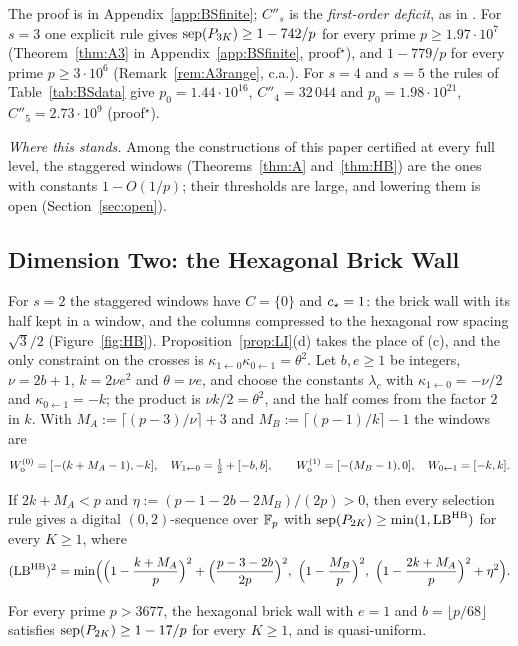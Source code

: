 The proof is in Appendix~\ref{app:BSfinite}; $C''_s$ is the \emph{first-order deficit}, as in \cite{Gru26geo}%
. For $s=3$ one explicit rule gives $\operatorname{sep}(P_{3K})\ge1-742/p$ for every prime $p\ge1.97\cdot10^7$ (Theorem~\ref{thm:A3} in Appendix~\ref{app:BSfinite}, proof${}^\star$), and $1-779/p$ for every prime $p\ge3\cdot10^6$ (Remark~\ref{rem:A3range}, c.a.). For $s=4$ and $s=5$ the rules of Table~\ref{tab:BSdata} give $p_0=1.44\cdot10^{16}$, $C''_4=32\,044$ and $p_0=1.98\cdot10^{21}$, $C''_5=2.73\cdot10^9$ (proof${}^\star$).

\emph{Where this stands.} Among the constructions of this paper certified at every full level, the staggered windows (Theorems~\ref{thm:A} and~\ref{thm:HB}) are the ones with constants $1-O(1/p)$; their thresholds are large, and lowering them is open (Section~\ref{sec:open}).

\subsection{Dimension Two: the Hexagonal Brick Wall}\label{sec:HB}
For $s=2$ the staggered windows have $C=\{0\}$ and $c_{\star}=1$: the brick wall with its half kept in a window, and the columns compressed to the hexagonal row spacing $\sqrt3/2$ (Figure~\ref{fig:HB}). Proposition~\ref{prop:LI}(d) takes the place of (c), and the only constraint on the crosses is $\kappa_{1\leftarrow0}\kappa_{0\leftarrow1}=\theta^2$. Let $b,e\ge1$ be integers, $\nu=2b+1$, $k=2\nu e^2$ and $\theta=\nu e$, and choose the constants $\lambda_c$ with $\kappa_{1\leftarrow0}=-\nu/2$ and $\kappa_{0\leftarrow1}=-k$; the product is $\nu k/2=\theta^2$, and the half comes from the factor $2$ in $k$. With $M_A:=\lceil(p-3)/\nu\rceil+3$ and $M_B:=\lceil(p-1)/k\rceil-1$ the windows are
\[
W_{\mathrm o}^{(0)}=[-(k+M_A-1),-k],\quad W_{1\leftarrow0}=\tfrac12+[-b,b],\qquad W_{\mathrm o}^{(1)}=[-(M_B-1),0],\quad W_{0\leftarrow1}=[-k,k].
\]

\begin{theorem}\label{thm:HB}
If $2k+M_A<p$ and $\eta:=(p-1-2b-2M_B)/(2p)>0$, then every selection rule gives a digital $(0,2)$-sequence over $\mathbb{F}_p$ with $\operatorname{sep}(P_{2K})\ge\min(1,\mathrm{LB}^{\mathrm{HB}})$ for every $K\ge1$, where
\[
(\LB^{\mathrm{HB}})^2=\min\Bigl(\Bigl(1-\frac{k+M_A}p\Bigr)^2+\Bigl(\frac{p-3-2b}{2p}\Bigr)^2,\ \Bigl(1-\frac{M_B}p\Bigr)^2,\ \Bigl(1-\frac{2k+M_A}p\Bigr)^2+\eta^2\Bigr).
\]
\end{theorem}

\begin{corollary}[Separation $1-17/p$]\label{cor:HB17}
For every prime $p>3677$, the hexagonal brick wall with $e=1$ and $b=\lfloor p/68\rfloor$ satisfies $\operatorname{sep}(P_{2K})\ge1-17/p$ for every $K\ge1$, and is quasi-uniform.
\end{corollary}

